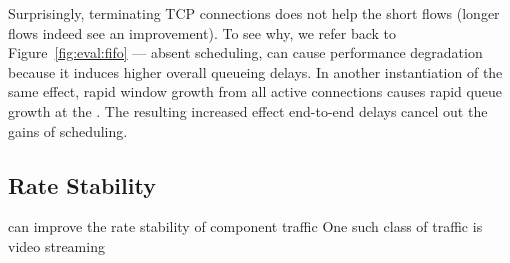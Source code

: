 

Surprisingly, terminating TCP connections does not help the short flows (longer flows indeed see an improvement). 
To see why, we refer back to Figure~\ref{fig:eval:fifo} --- absent scheduling, \name can cause performance degradation because it induces higher overall queueing delays.
In another instantiation of the same effect, rapid window growth from all active connections causes rapid queue growth at the \inbox. The resulting increased effect end-to-end delays cancel out the gains of scheduling.

\subsection{Rate Stability}\label{s:eval:ratestable}

\begin{outline}
    \1 \name can improve the rate stability of component traffic
    \1 One such class of traffic is video streaming
\end{outline}

